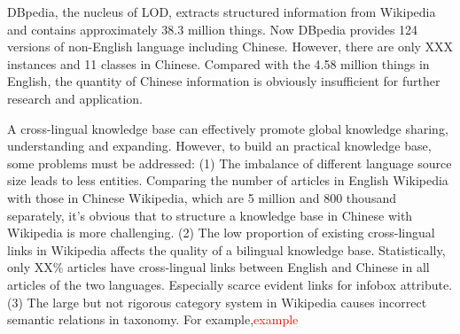 \documentclass[runningheads,a4paper]{llncs}
\begin{document}
DBpedia, the nucleus of LOD, extracts structured information from Wikipedia and contains approximately 38.3 million things. Now DBpedia provides 124 versions of non-English language including Chinese. However, there are only XXX instances and 11 classes in Chinese. Compared with the 4.58 million things in English, the quantity of Chinese information is obviously insufficient for further research and application.

A cross-lingual knowledge base can effectively promote global knowledge sharing, understanding and expanding. However, to build an practical knowledge base, some problems must be addressed: (1) The imbalance of different language source size leads to less entities. Comparing the number of articles in English Wikipedia with those in Chinese Wikipedia, which are 5 million and 800 thousand separately, it's obvious that to structure a knowledge base in Chinese with Wikipedia is more challenging. (2) The low proportion of existing cross-lingual links in Wikipedia affects the quality of a bilingual knowledge base. Statistically, only XX\% articles have cross-lingual links between English and Chinese in all articles of the two languages. Especially scarce evident links for infobox attribute. (3) The large but not rigorous category system in Wikipedia causes incorrect semantic relations in taxonomy. For example,\textcolor{red}{example}


\end{document}
